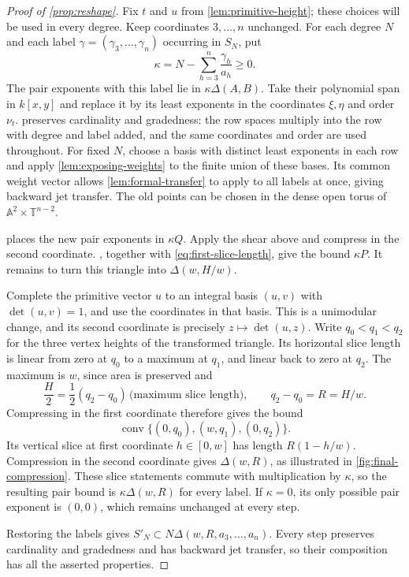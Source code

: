 \begin{proof}[Proof of \cref{prop:reshape}]
Fix $t$ and $u$ from \cref{lem:primitive-height}; these choices will be used in every degree.  Keep coordinates $3,\ldots,n$ unchanged. For each degree $N$ and each label $\gamma=(\gamma_3,\ldots,\gamma_n)$ occurring in $S_N$, put
\[
 \kappa=N-\sum_{h=3}^n\frac{\gamma_h}{a_h}\ge0.
\]
The pair exponents with this label lie in $\kappa\Delta(A,B)$. Take their polynomial span in $k[x,y]$ and replace it by its least exponents in the coordinates $\xi,\eta$ and order $\nu_t$.  preserves cardinality and gradedness: the row spaces multiply into the row with degree and label added, and the same coordinates and order are used throughout.  For fixed $N$, choose a basis with distinct least exponents in each row and apply \cref{lem:exposing-weights} to the finite union of these bases. Its common weight vector allows \cref{lem:formal-transfer} to apply to all labels at once, giving backward jet transfer.  The old points can be chosen in the dense open torus of $\mathbb{A}^2\times\mathbb{T}^{n-2}$.

 places the new pair exponents in $\kappa Q$. Apply the shear above and compress in the second coordinate. , together with \eqref{eq:first-slice-length}, give the bound $\kappa P$. It remains to turn this triangle into $\Delta(w,H/w)$.

Complete the primitive vector $u$ to an integral basis $(u,v)$ with $\det(u,v)=1$, and use the coordinates in that basis.  This is a unimodular change, and its second coordinate is precisely $z\mapsto\det(u,z)$.  Write $q_0<q_1<q_2$ for the three vertex heights of the transformed triangle.  Its horizontal slice length is linear from zero at $q_0$ to a maximum at $q_1$, and linear back to zero at $q_2$. The maximum is $w$, since area is preserved and
\[
 \frac H2=\frac12(q_2-q_0)\,\bigl(\text{maximum slice length}\bigr),
 \qquad q_2-q_0=R=H/w.
\]
Compressing in the first coordinate therefore gives the bound
\[
 \operatorname{conv}\{(0,q_0),(w,q_1),(0,q_2)\}.
\]
Its vertical slice at first coordinate $h\in[0,w]$ has length $R(1-h/w)$.  Compression in the second coordinate gives $\Delta(w,R)$, as illustrated in \cref{fig:final-compression}.  These slice statements commute with multiplication by $\kappa$, so the resulting pair bound is $\kappa\Delta(w,R)$ for every label.  If $\kappa=0$, its only possible pair exponent is $(0,0)$, which remains unchanged at every step.

Restoring the labels gives $S'_N\subset N\Delta(w,R,a_3,\ldots,a_n)$.  Every step preserves cardinality and gradedness and has backward jet transfer, so their composition has all the asserted properties.
\end{proof}


